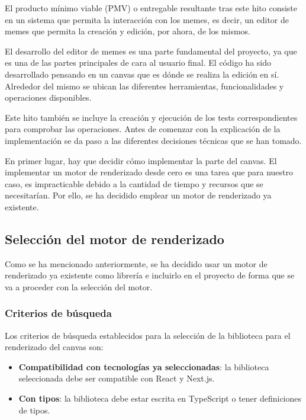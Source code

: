 El producto mínimo viable (PMV) o entregable resultante tras este hito consiste en un sistema que permita la interacción con los memes, es decir, un editor de memes que permita la creación y edición, por ahora, de los mismos.

El desarrollo del editor de memes es una parte fundamental del proyecto, ya que es una de las partes principales de cara al usuario final. El código ha sido desarrollado pensando en un canvas que es dónde se realiza la edición en sí. Alrededor del mismo se ubican las diferentes herramientas, funcionalidades y operaciones disponibles.

Este hito también se incluye la creación y ejecución de los tests correspondientes para comprobar las operaciones. Antes de comenzar con la explicación de la implementación se da paso a las diferentes decisiones técnicas que se han tomado.

En primer lugar, hay que decidir cómo implementar la parte del canvas. El implementar un motor de renderizado desde cero es una tarea que para nuestro caso, es impracticable debido a la cantidad de tiempo y recursos que se necesitarían. Por ello, se ha decidido emplear un motor de renderizado ya existente.

\subsection{Selección del motor de renderizado}

Como se ha mencionado anteriormente, se ha decidido usar un motor de renderizado ya existente como librería e incluirlo en el proyecto de forma que se va a proceder con la selección del motor.

\subsubsection{Criterios de búsqueda}

Los criterios de búsqueda establecidos para la selección de la biblioteca para el renderizado del canvas son:

\begin{itemize}
    \item \textbf{Compatibilidad con tecnologías ya seleccionadas}: la biblioteca seleccionada debe ser compatible con React y Next.js.
    \item \textbf{Con tipos}: la biblioteca debe estar escrita en TypeScript o tener definiciones de tipos.
\end{itemize}

